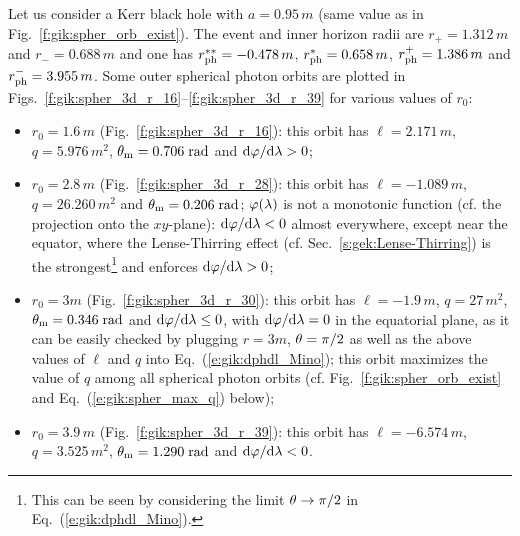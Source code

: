 \begin{example} \label{x:gik:outer_spher}
Let us consider a Kerr black hole with $a=0.95\, m$ (same value as in
Fig.~\ref{f:gik:spher_orb_exist}). The event and inner horizon radii
are $r_+ = 1.312\, m$ and $r_- = 0.688\, m$ and one has
$r_{\rm ph}^{**} = - 0.478\, m$, $r_{\rm ph}^{*} = 0.658\, m$,
$r_{\rm ph}^+ = 1.386\, m$ and $r_{\rm ph}^- = 3.955\, m$.
Some outer spherical photon orbits are plotted in
Figs.~\ref{f:gik:spher_3d_r_16}--\ref{f:gik:spher_3d_r_39}
for various values of $r_0$:
\begin{itemize}
\item $r_0 = 1.6\, m$ (Fig.~\ref{f:gik:spher_3d_r_16}): this orbit
has $\ell = 2.171\, m$, $q=5.976\, m^2$, $\theta_{\rm m} = 0.706\;{\rm rad}$ and $\mathrm{d}\varphi/\mathrm{d}\lambda > 0$;
\item $r_0 = 2.8\, m$ (Fig.~\ref{f:gik:spher_3d_r_28}): this orbit
has $\ell = -1.089\, m$, $q=26.260\, m^2$ and $\theta_{\rm m} = 0.206\;{\rm rad}$;
$\varphi(\lambda)$ is not a monotonic function (cf. the projection onto the $xy$-plane):
$\mathrm{d}\varphi/\mathrm{d}\lambda < 0$ almost everywhere, except
near the equator, where the Lense-Thirring effect (cf. Sec.~\ref{s:gek:Lense-Thirring})
is the strongest\footnote{This can be seen
by considering the limit $\theta\to\pi/2$ in Eq.~(\ref{e:gik:dphdl_Mino}).} and
enforces $\mathrm{d}\varphi/\mathrm{d}\lambda > 0$;
\item $r_0 = 3 m$ (Fig.~\ref{f:gik:spher_3d_r_30}): this orbit
has $\ell = -1.9\, m$, $q=27\, m^2$, $\theta_{\rm m} = 0.346\;{\rm rad}$ and
$\mathrm{d}\varphi/\mathrm{d}\lambda \leq 0$, with $\mathrm{d}\varphi/\mathrm{d}\lambda = 0$ in the equatorial plane,
as it can be easily checked by plugging $r=3m$, $\theta=\pi/2$ as well as
the above values of $\ell$ and $q$ into Eq.~(\ref{e:gik:dphdl_Mino});
this orbit maximizes the value of $q$ among all spherical photon orbits
(cf. Fig.~\ref{f:gik:spher_orb_exist} and Eq.~(\ref{e:gik:spher_max_q}) below);
\item $r_0 = 3.9\, m$ (Fig.~\ref{f:gik:spher_3d_r_39}): this orbit
has $\ell = -6.574\, m$, $q=3.525\, m^2$, $\theta_{\rm m} = 1.290\;{\rm rad}$
and $\mathrm{d}\varphi/\mathrm{d}\lambda < 0$.
\end{itemize}
\end{example}

